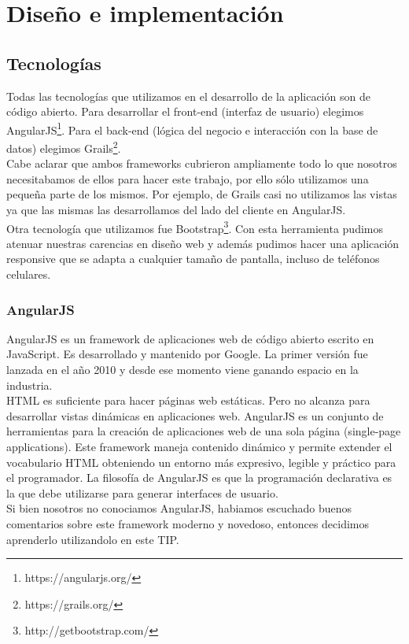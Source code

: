 \section{Diseño e implementación}
\subsection{Tecnologías}
Todas las tecnologías que utilizamos en el desarrollo de la aplicación son de código abierto. Para desarrollar el front-end (interfaz de usuario) elegimos AngularJS\footnote{https://angularjs.org/}. Para el back-end (lógica del negocio e interacción con la base de datos) elegimos Grails\footnote{https://grails.org/}.\\
Cabe aclarar que ambos frameworks cubrieron ampliamente todo lo que nosotros necesitabamos de ellos para hacer este trabajo, por ello sólo utilizamos una pequeña parte de los mismos. Por ejemplo, de Grails casi no utilizamos las vistas ya que las mismas las desarrollamos del lado del cliente en AngularJS.\\
Otra tecnología que utilizamos fue Bootstrap\footnote{http://getbootstrap.com/}. Con esta herramienta pudimos atenuar nuestras carencias en diseño web y además pudimos hacer una aplicación responsive que se adapta a cualquier tamaño de pantalla, incluso de teléfonos celulares.
\subsubsection{AngularJS}
AngularJS es un framework de aplicaciones web de código abierto escrito en JavaScript. Es desarrollado y mantenido por Google. La primer versión fue lanzada en el año 2010 y desde ese momento viene ganando espacio en la industria.\\
HTML es suficiente para hacer páginas web estáticas. Pero no alcanza para desarrollar vistas dinámicas en aplicaciones web. AngularJS es un conjunto de herramientas para la creación de aplicaciones web de una sola página (single-page applications). Este framework maneja contenido dinámico y permite extender el vocabulario HTML obteniendo un entorno más expresivo, legible y práctico para el programador. La filosofía de AngularJS es que la programación declarativa es la que debe utilizarse para generar interfaces de usuario.\\
Si bien nosotros no conociamos AngularJS, habiamos escuchado buenos comentarios sobre este framework moderno y novedoso, entonces decidimos aprenderlo utilizandolo en este TIP.
